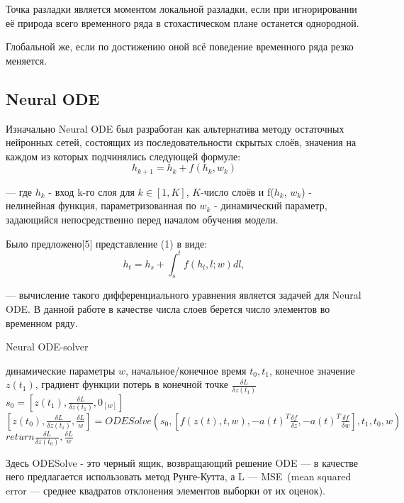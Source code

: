\documentclass{article}
\begin{document}
    \par Точка разладки является моментом локальной разладки, если при игнорировании её природа всего временного ряда в стохастическом плане останется однородной.
    
    \par Глобальной же, если по достижению оной всё поведение временного ряда резко меняется.  
    
  \subsection{Neural ODE}
    \par Изначально Neural ODE был разработан как альтернатива методу остаточных нейронных сетей, состоящих из последовательности скрытых слоёв, значения на каждом из которых подчинялись следующей формуле:
    \begin{equation} h_{k+1} = h_k + f(h_k, w_k)    \end{equation}
    \par --- где $h_k$ - вход k-го слоя для $k \in [1, K]$, $K$-число слоёв и f($h_k$, $w_k$) - нелинейная функция, параметризованная по $w_k$ - динамический параметр, задающийся непосредственно перед началом обучения модели.
    \par Было предложено[5] представление (1) в виде:
    \begin{equation} h_{t} = h_s + \int_s^t f(h_l, l; w) dl,    \end{equation}
    \par --- вычисление такого дифференциального уравнения является задачей для Neural ODE. В данной работе в качестве числа слоев берется число элементов во временном ряду.

    \begin{algorithm}
     \caption{Neural ODE-solver}\label{alg:cap}
     \begin{algorithmic}
    \Require динамические параметры $w$, начальное/конечное время $t_0,t_1$, конечное значение $z(t_1)$, градиент функции потерь в конечной точке $\frac{\delta L}{\delta z(t_1)}$
    \State $s_0 = [z(t_1), \frac{\delta L}{\delta z(t_1)}, 0_{[w]}]$ 
    \State $[z(t_0), \frac{\delta L}{\delta z(t_1)}, \frac{\delta L}{w}] = ODESolve(s_0, [f(z(t), t, w), -a(t)^T \frac{\delta f}{\delta z}, -a(t)^T \frac{\delta f}{\delta w}], t_1, t_0, w)$
    \State $return \frac{\delta L}{\delta z(t_0)}, \frac{\delta L}{w}$ 
\end{algorithmic}
\end{algorithm}
   \par Здесь ODESolve - это черный ящик, возвращающий решение ODE --- в качестве него предлагается использовать метод Рунге-Кутта, а L --- MSE~(mean squared error --- среднее квадратов отклонения элементов выборки от их оценок).
    
\end{document}
